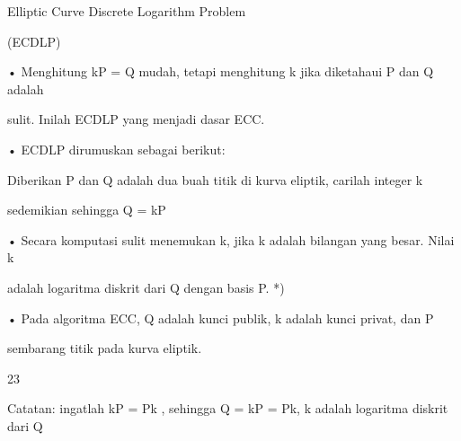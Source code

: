 \documentclass{article}
\begin{document}

Elliptic Curve Discrete Logarithm Problem 

(ECDLP)

• Menghitung kP = Q mudah, tetapi menghitung k jika diketahaui P dan Q adalah 

sulit. Inilah ECDLP yang menjadi dasar ECC.

• ECDLP dirumuskan sebagai berikut:

 Diberikan P dan Q adalah dua buah titik di kurva eliptik, carilah integer k 

sedemikian sehingga Q = kP

• Secara komputasi sulit menemukan k, jika k adalah bilangan yang besar.  Nilai k 

adalah logaritma diskrit dari Q dengan basis P.     *)

• Pada algoritma ECC, Q adalah kunci publik, k adalah kunci privat, dan P 

sembarang titik pada kurva eliptik.

23

Catatan: ingatlah kP = Pk , sehingga Q = kP = Pk, k adalah logaritma diskrit dari Q
\end{document}
